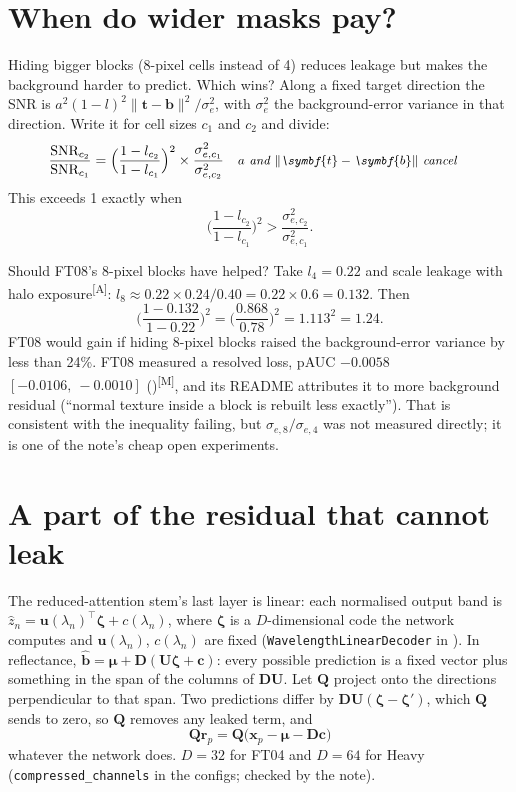 \documentclass[11pt,a4paper,oneside,openany]{book}
\newcommand{\B}[1]{{\symbf{#1}}}
\newcommand{\B}[1]{{\bm{#1}}}
\newcommand{\meas}{\textsuperscript{\textsf{\scriptsize[M]}}}
\newcommand{\assm}{\textsuperscript{\textsf{\scriptsize[A]}}}
\newcommand{\T}{^{\top}}
\newcommand{\nrm}[1]{\lVert #1\rVert}
\newcommand{\vx}{\B{x}}
\newcommand{\vt}{\B{t}}
\newcommand{\vb}{\B{b}}
\newcommand{\vbh}{\hat{\B{b}}}
\newcommand{\vr}{\B{r}}
\newcommand{\vu}{\B{u}}
\newcommand{\vc}{\B{c}}
\newcommand{\vzeta}{\B{\zeta}}
\newcommand{\vmu}{\B{\mu}}
\newcommand{\mU}{\B{U}}
\newcommand{\mD}{\B{D}}
\newcommand{\mQ}{\B{Q}}
\newcommand{\why}[1]{&&\text{\small\itshape #1}}
\begin{document}
\section{When do wider masks pay?}

Hiding bigger blocks (8-pixel cells instead of 4) reduces leakage but makes the background harder to predict. Which wins? Along a fixed target direction the
SNR is $a^2(1-l)^2\nrm{\vt-\vb}^2/\sigma_e^2$, with $\sigma_e^2$ the background-error variance in that direction. Write it for cell sizes $c_1$ and $c_2$ and divide:
\begin{align*}
\frac{\text{SNR}_{c_2}}{\text{SNR}_{c_1}} &= \Big(\frac{1-l_{c_2}}{1-l_{c_1}}\Big)^2\times\frac{\sigma^2_{e,c_1}}{\sigma^2_{e,c_2}} \why{$a$ and $\nrm{\vt-\vb}$ cancel}
\end{align*}
This exceeds 1 exactly when
\[
  \Big(\frac{1-l_{c_2}}{1-l_{c_1}}\Big)^2>\frac{\sigma^2_{e,c_2}}{\sigma^2_{e,c_1}} .
\]

\begin{worked}[label=we:wider]{Should FT08's 8-pixel blocks have helped?}
Take $l_4=0.22$ and scale leakage with halo exposure\assm: $l_8\approx0.22\times0.24/0.40=0.22\times0.6=0.132$. Then
\[
  \Big(\frac{1-0.132}{1-0.22}\Big)^2=\Big(\frac{0.868}{0.78}\Big)^2=1.113^2=1.24 .
\]
FT08 would gain if hiding 8-pixel blocks raised the background-error variance by less than 24\%. FT08 measured a resolved loss, pAUC $-0.0058$
$[-0.0106,\ -0.0010]$ ()\meas, and its README attributes it to more background residual (``normal texture inside a block is rebuilt
less exactly''). That is consistent with the inequality failing, but $\sigma_{e,8}/\sigma_{e,4}$ was not measured directly; it is one of the note's cheap open
experiments.
\end{worked}

\section{A part of the residual that cannot leak}

The reduced-attention stem's last layer is linear: each normalised output band is $\hat z_n=\vu(\lambda_n)\T\vzeta+c(\lambda_n)$, where $\vzeta$ is a
$D$-dimensional code the network computes and $\vu(\lambda_n)$, $c(\lambda_n)$ are fixed (\texttt{Wavelength\-Linear\-Decoder} in
). In reflectance, $\vbh=\vmu+\mD(\mU\vzeta+\vc)$: every possible prediction is a fixed vector plus
something in the span of the columns of $\mD\mU$. Let $\mQ$ project onto the directions perpendicular to that span. Two predictions differ by
$\mD\mU(\vzeta-\vzeta')$, which $\mQ$ sends to zero, so $\mQ$ removes any leaked term, and
\[
  \mQ\vr_p=\mQ\big(\vx_p-\vmu-\mD\vc\big)
\]
whatever the network does. $D=32$ for FT04 and $D=64$ for Heavy (\texttt{compressed\_channels} in the configs; checked by the note).
\end{document}
